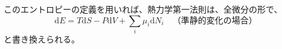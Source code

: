 \documentclass[uplatex,dvipdfmx,a4paper,11pt]{jsarticle}
\newcommand{\diff}{\mathrm d}
\begin{document}
\begin{appendix}
\begin{enumerate}
\begin{enumerate}
このエントロピーの定義を用いれば、熱力学第一法則は、全微分の形で、
\begin{equation*}
\diff E = T \diff S - P \diff V + \sum_i \mu_i \diff N_i \quad \text{（準静的変化の場合）}
\end{equation*}	
と書き換えられる。

\end{enumerate}

%
%
%
%
%
%
%
%
%
%
%
%
%
%
%
%

\end{enumerate}
\end{appendix}
\end{document}

